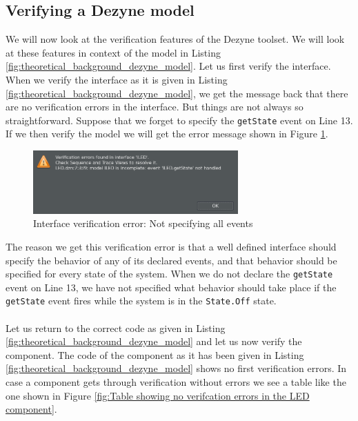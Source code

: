 \documentclass[12pt]{scrreprt}
\begin{document}
\begin{appendices}
\subsection{Verifying a Dezyne model}
\label{Verifying a Dezyne model}
We will now look at the verification features of the Dezyne toolset. We will look at these features in context of the model in Listing \ref{fig:theoretical_background_dezyne_model}. Let us first verify the interface. When we verify the interface as it is given in Listing \ref{fig:theoretical_background_dezyne_model}, we get the message back that there are no verification errors in the interface. But things are not always so straightforward. Suppose that we forget to specify the \texttt{getState} event on Line 13. If we then verify the model we will get the error message shown in Figure \ref{fig:not_specifying_all_events_error}.

\begin{figure}[H]
    \centering
    \includegraphics[width=0.7\textwidth]{Figures/theoretical_background/verification_of_interface_error.png}
    \caption{Interface verification error: Not specifying all events}
    \label{fig:not_specifying_all_events_error}
\end{figure}

The reason we get this verification error is that a well defined interface should specify the behavior of any of its declared events, and that behavior should be specified for every state of the system. When we do not declare the \texttt{getState} event on Line 13, we have not specified what behavior should take place if the \texttt{getState} event fires while the system is in the \texttt{State.Off} state.
\\\\
Let us return to the correct code as given in Listing \ref{fig:theoretical_background_dezyne_model} and let us now verify the component. The code of the component as it has been given in Listing \ref{fig:theoretical_background_dezyne_model} shows no first verification errors. In case a component gets through verification without errors we see a table like the one shown in Figure \ref{fig:Table showing no verifcation errors in the LED component}.


\end{appendices}
\end{document}
